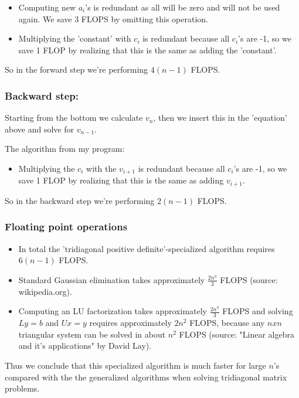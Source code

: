 \documentclass[norsk,a4paper,12pt]{article}
\begin{document}
\begin{itemize}
\item Computing new $a_i$'s is redundant as all will be zero and will not be used again. We save 3 FLOPS by omitting this operation.
\item Multiplying the 'constant' with $c_i$ is redundant because all $c_i$'s are -1, so we save 1 FLOP by realizing that this is the same as adding the 'constant'.
\end{itemize}

So in the forward step we're performing $4(n-1)$ FLOPS.


\subsubsection*{Backward step:}
Starting from the bottom we calculate $v_n$, then we insert this in the 'equation' above and solve for $v_{n-1}$.

The algorithm from my program:



\begin{itemize}
\item Multiplying the $c_i$ with  the $v_{i+1}$ is redundant because all $c_i$'s are -1, so we save 1 FLOP by realizing that this is the same as adding $v_{i+1}$.
\end{itemize}
So in the backward step we're performing $2(n-1)$ FLOPS.


\subsubsection*{Floating point operations}
\begin{itemize}
\item In total the 'tridiagonal positive definite'-specialized algorithm requires $6(n-1)$ FLOPS.
\item Standard Gaussian elimination takes approximately $\frac{2n^3}{3}$ FLOPS (source: wikipedia.org).
\item Computing an LU factorization takes approximately $\frac{2n^3}{3}$ FLOPS and solving $Ly = b$ and $Ux = y$ requires approximately $2n^2$ FLOPS, because any $n x n$ triangular system can be solved in about $n^2$ FLOPS (source: "Linear algebra and it's applications" by David Lay).
\end{itemize}

Thus we conclude that this specialized algorithm is much faster for large $n$'s compared with the the generalized algorithms when solving tridiagonal matrix problems.
\end{document}
